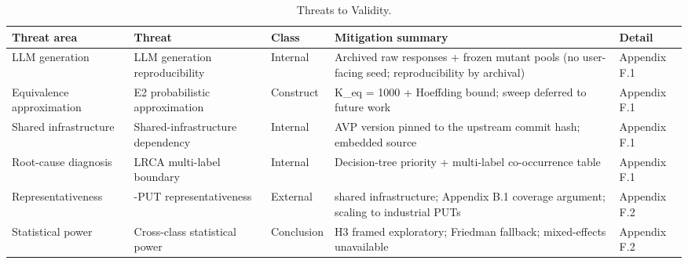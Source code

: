 \documentclass[12pt]{article}
\begin{document}
{\def\LTcaptype{table} %
\begin{longtable}[]{@{}
  >{\raggedright\arraybackslash}p{}
  >{\raggedright\arraybackslash}p{}
  >{\raggedright\arraybackslash}p{}
  >{\raggedright\arraybackslash}p{}
  >{\raggedright\arraybackslash}p{}@{}}
\caption{Threats to Validity.}\label{tab:p2-14}\\
\toprule\noalign{}
\begin{minipage}[b]{\linewidth}\raggedright
Threat area
\end{minipage} & \begin{minipage}[b]{\linewidth}\raggedright
Threat
\end{minipage} & \begin{minipage}[b]{\linewidth}\raggedright
Class
\end{minipage} & \begin{minipage}[b]{\linewidth}\raggedright
Mitigation summary
\end{minipage} & \begin{minipage}[b]{\linewidth}\raggedright
Detail
\end{minipage} \\
\midrule\noalign{}
\endfirsthead
\endhead
\bottomrule\noalign{}
\endlastfoot
LLM generation & LLM generation reproducibility & Internal & Archived raw responses
+ frozen mutant pools (no user-facing seed; reproducibility by archival) & Appendix F.1 \\
Equivalence approximation & E2 probabilistic approximation & Construct & K\_eq = 1000 +
Hoeffding bound; sweep deferred to future work & Appendix F.1 \\
Shared infrastructure & Shared-infrastructure dependency & Internal & AVP version pinned to the upstream
commit hash; embedded source & Appendix F.1 \\
Root-cause diagnosis & LRCA multi-label boundary & Internal & Decision-tree priority +
multi-label co-occurrence table & Appendix F.1 \\
Representa\-tiveness & 12-PUT representativeness & External & shared infrastructure; Appendix B.1
coverage argument; scaling to industrial PUTs & Appendix F.2 \\
Statistical power & Cross-class statistical power & Conclusion & H3 framed exploratory;
Friedman fallback; mixed-effects unavailable & Appendix F.2 \\

\end{longtable}}
\end{document}
